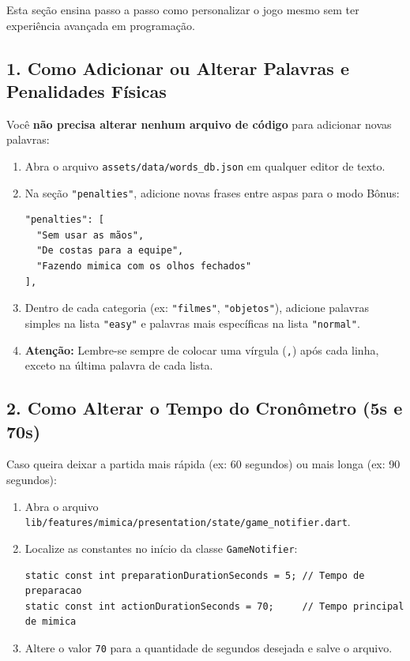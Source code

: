 \documentclass[12pt,a4paper]{article}
\begin{document}
Esta seção ensina passo a passo como personalizar o jogo mesmo sem ter experiência avançada em programação.

\subsection{1. Como Adicionar ou Alterar Palavras e Penalidades Físicas}
Você \textbf{não precisa alterar nenhum arquivo de código} para adicionar novas palavras:
\begin{enumerate}
  \item Abra o arquivo \texttt{assets/data/words\_db.json} em qualquer editor de texto.
  \item Na seção \texttt{"penalties"}, adicione novas frases entre aspas para o modo Bônus:
\begin{lstlisting}
"penalties": [
  "Sem usar as mãos",
  "De costas para a equipe",
  "Fazendo mimica com os olhos fechados"
],
\end{lstlisting}
  \item Dentro de cada categoria (ex: \texttt{"filmes"}, \texttt{"objetos"}), adicione palavras simples na lista \texttt{"easy"} e palavras mais específicas na lista \texttt{"normal"}.
  \item \textbf{Atenção:} Lembre-se sempre de colocar uma vírgula (\texttt{,}) após cada linha, exceto na última palavra de cada lista.
\end{enumerate}

\subsection{2. Como Alterar o Tempo do Cronômetro (5s e 70s)}
Caso queira deixar a partida mais rápida (ex: 60 segundos) ou mais longa (ex: 90 segundos):
\begin{enumerate}
  \item Abra o arquivo \texttt{lib/features/mimica/presentation/state/game\_notifier.dart}.
  \item Localize as constantes no início da classe \texttt{GameNotifier}:
\begin{lstlisting}
static const int preparationDurationSeconds = 5; // Tempo de preparacao
static const int actionDurationSeconds = 70;     // Tempo principal de mimica
\end{lstlisting}
  \item Altere o valor \texttt{70} para a quantidade de segundos desejada e salve o arquivo.
\end{enumerate}
\end{document}
